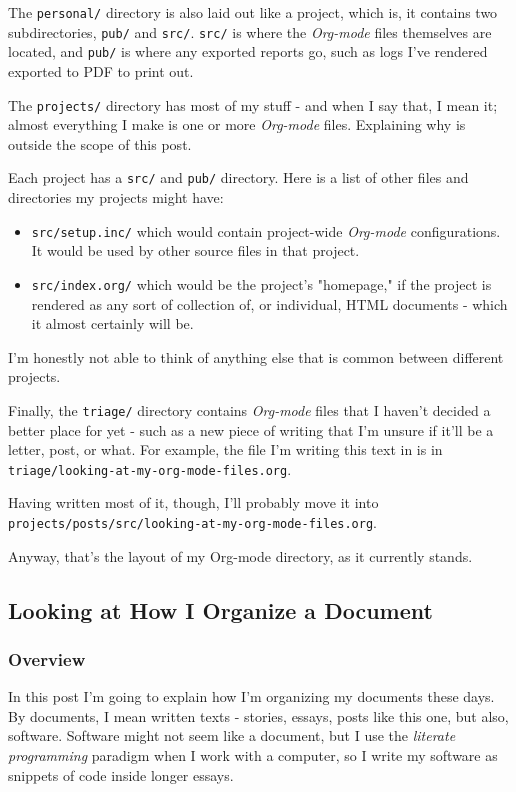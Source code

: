 \documentclass[11pt]{article}
\begin{document}
The \texttt{personal/} directory is also laid out like a project, which is,
it contains two subdirectories, \texttt{pub/} and \texttt{src/}. \texttt{src/} is where the
\emph{Org-mode} files themselves are located, and \texttt{pub/} is where any
exported reports go, such as logs I've rendered exported to PDF to
print out.

The \texttt{projects/} directory has most of my stuff - and when I say that,
I mean it; almost everything I make is one or more \emph{Org-mode} files.
Explaining why is outside the scope of this post.

Each project has a \texttt{src/} and \texttt{pub/} directory. Here is a list of
other files and directories my projects might have:

\begin{itemize}
\item \texttt{src/setup.inc/} which would contain project-wide \emph{Org-mode}
configurations. It would be used by other source files in that
project.
\item \texttt{src/index.org/} which would be the project's "homepage," if the
project is rendered as any sort of collection of, or individual,
HTML documents - which it almost certainly will be.
\end{itemize}

I'm honestly not able to think of anything else that is common between
different projects.

Finally, the \texttt{triage/} directory contains \emph{Org-mode} files that I
haven't decided a better place for yet - such as a new piece of
writing that I'm unsure if it'll be a letter, post, or what. For
example, the file I'm writing this text in is in
\texttt{triage/looking-at-my-org-mode-files.org}.

Having written most of it, though, I'll probably move it into
\texttt{projects/posts/src/looking-at-my-org-mode-files.org}.

Anyway, that's the layout of my Org-mode directory, as it currently
stands.

\subsection*{Looking at How I Organize a Document}
\label{sec:org0ad67c9}
\subsubsection*{Overview}
\label{sec:org3a20263}
In this post I'm going to explain how I'm organizing my documents
these days. By documents, I mean written texts - stories, essays,
posts like this one, but also, software. Software might not seem like
a document, but I use the \emph{literate programming} paradigm when I work
with a computer, so I write my software as snippets of code inside
longer essays.
\end{document}
